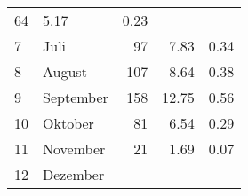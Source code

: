 \begin{longtable}{lXrrr}
       \num{64} &
       \num[round-mode=places,round-precision=2]{5,17} &
         \num[round-mode=places,round-precision=2]{0,23} \\

     7 &
     \multicolumn{1}{X}{ Juli   } &


       \num{97} &
       \num[round-mode=places,round-precision=2]{7,83} &
         \num[round-mode=places,round-precision=2]{0,34} \\

     8 &
     \multicolumn{1}{X}{ August   } &


       \num{107} &
       \num[round-mode=places,round-precision=2]{8,64} &
         \num[round-mode=places,round-precision=2]{0,38} \\

     9 &
     \multicolumn{1}{X}{ September   } &


       \num{158} &
       \num[round-mode=places,round-precision=2]{12,75} &
         \num[round-mode=places,round-precision=2]{0,56} \\

     10 &
     \multicolumn{1}{X}{ Oktober   } &


       \num{81} &
       \num[round-mode=places,round-precision=2]{6,54} &
         \num[round-mode=places,round-precision=2]{0,29} \\

     11 &
     \multicolumn{1}{X}{ November   } &


       \num{21} &
       \num[round-mode=places,round-precision=2]{1,69} &
         \num[round-mode=places,round-precision=2]{0,07} \\

     12 &
     \multicolumn{1}{X}{ Dezember   } &



\end{longtable}
